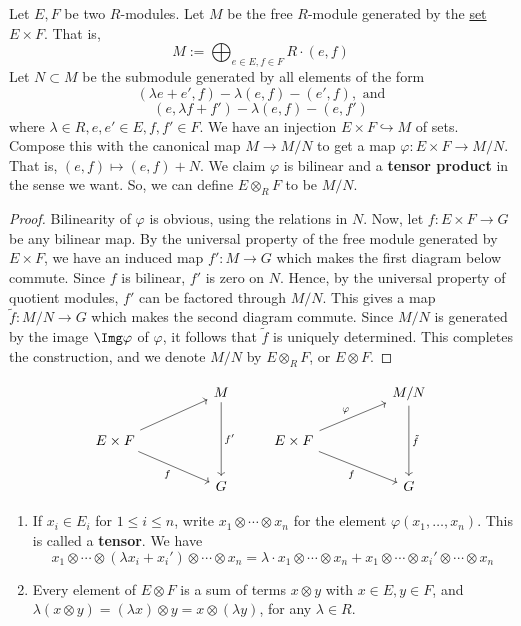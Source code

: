 \begin{defn}
    Let $E,F$ be two $R$-modules. Let $M$ be the free $R$-module generated by the \underline{set} $E \times F$. That is,
    $$M:= \bigoplus_{e \in E,f\in F}R\cdot (e,f)$$
    Let $N \subset M$ be the submodule generated by all elements of the form
    $$(\lambda e+e',f)-\lambda(e,f)-(e',f),\text{ and}$$
    $$(e,\lambda f+f') - \lambda(e,f) - (e,f')$$
    where $\lambda \in R,e,e'\in E,f,f' \in F$. We have an injection $E \times F \hookrightarrow M$ of sets. Compose this with the canonical map $M \to M/N$ to get a map $\varphi :E \times F \to M/N$. That is, $(e,f) \mapsto (e,f)+N$. We claim $\varphi$ is bilinear and a \textbf{tensor product} in the sense we want. So, we can define $E \otimes _RF$ to be $M/N$.
\end{defn}
\begin{proof}
    Bilinearity of $\varphi$ is obvious, using the relations in $N$. Now, let $f:E \times F \to G$ be any bilinear map. By the universal property of the free module generated by $E \times F$, we have an induced map $f': M \to G$ which makes the first diagram below commute. Since $f$ is bilinear, $f'$ is zero on $N$. Hence, by the universal property of quotient modules, $f'$ can be factored through $M/N$. This gives a map $\tilde f:M /N \to G$ which makes the second diagram commute. Since $M/N$ is generated by the image $\Img \varphi$ of $\varphi$, it follows that $\tilde f$ is uniquely determined. This completes the construction, and we denote $M/N$ by $E \otimes _R F$, or $E \otimes F$.
\end{proof}
\[\begin{tikzcd}
	&& M &&& {M/N} \\
	{E \times F} &&& {E \times F} \\
	&& G &&& G
	\arrow["{f'}", from=1-3, to=3-3]
	\arrow["{\tilde f}", from=1-6, to=3-6]
	\arrow[from=2-1, to=1-3]
	\arrow["f"', from=2-1, to=3-3]
	\arrow["\varphi", from=2-4, to=1-6]
	\arrow["f"', from=2-4, to=3-6]
\end{tikzcd}\]

\begin{rmk}
    \begin{enumerate}
        \item If $x _i \in E_i$ for $1 \leq i \leq n$, write $x_1 \otimes \cdots \otimes x_n$ for the element $\varphi(x_1,\dots,x_n)$. This is called a \textbf{tensor}. We have
        $$x_1\otimes \cdots \otimes (\lambda x_i + x_i')\otimes \cdots \otimes x_n = \lambda \cdot  x_1\otimes \cdots \otimes x_n + x_1 \otimes\cdots \otimes x_i'\otimes \cdots \otimes x_n$$
        \item Every element of $E \otimes F$ is a sum of terms $x \otimes y$ with $x \in E, y \in F$, and $\lambda( x \otimes y)= (\lambda x)\otimes y = x \otimes (\lambda y)$, for any $\lambda \in R$.
    \end{enumerate}
\end{rmk}


